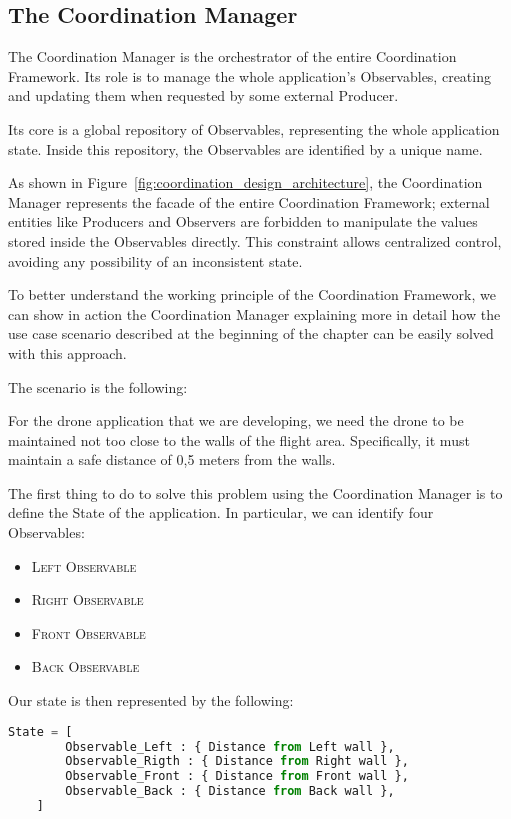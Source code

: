 \subsection{The Coordination Manager}\label{subsec:coordination_manager}

The Coordination Manager is the orchestrator of the entire Coordination Framework. 
Its role is to manage the whole application's Observables, creating and updating them when requested by some external Producer.

Its core is a global repository of Observables, representing the whole application state. 
Inside this repository, the Observables are identified by a unique name. 

As shown in Figure~\ref{fig:coordination_design_architecture}, the Coordination Manager represents the facade of the entire Coordination Framework; external entities like Producers and Observers are forbidden to manipulate the values stored inside the Observables directly.
This constraint allows centralized control, avoiding any possibility of an inconsistent state.

To better understand the working principle of the Coordination Framework, we can show in action the Coordination Manager explaining more in detail how the use case scenario described at the beginning of the chapter can be easily solved with this approach.

The scenario is the following:
\begin{displayquote}
    For the drone application that we are developing, we need the drone to be maintained not too close to the walls of the flight area. 
    Specifically, it must maintain a safe distance of 0,5 meters from the walls.
\end{displayquote}

The first thing to do to solve this problem using the Coordination Manager is to define the State of the application. 
In particular, we can identify four Observables:
\begin{itemize}
    \item \textsc{Left Observable} 
    \item \textsc{Right Observable} 
    \item \textsc{Front Observable} 
    \item \textsc{Back Observable}
\end{itemize}

Our state is then represented by the following:

\begin{lstlisting}[language=Python]
    State = [
		Observable_Left : { Distance from Left wall },
		Observable_Rigth : { Distance from Right wall },
		Observable_Front : { Distance from Front wall },
		Observable_Back : { Distance from Back wall },
	]
\end{lstlisting}


